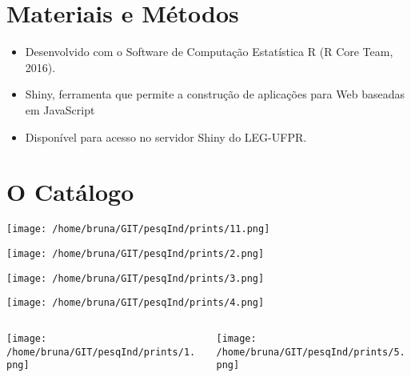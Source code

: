 \section{Materiais e Métodos}\label{materiais-e-metodos}

\begin{frame}

\begin{itemize}
\tightlist
\item
  Desenvolvido com o Software de Computação Estatística R (R Core Team,
  2016).
\item
  Shiny, ferramenta que permite a construção de aplicações para Web
  baseadas em JavaScript
\item
  Disponível para acesso no servidor Shiny do LEG-UFPR.
\end{itemize}

\end{frame}

\section{O Catálogo}\label{o-catalogo}

\begin{frame}

\texttt{[image: /home/bruna/GIT/pesqInd/prints/11.png]}

\end{frame}

\begin{frame}

\texttt{[image: /home/bruna/GIT/pesqInd/prints/2.png]}

\texttt{[image: /home/bruna/GIT/pesqInd/prints/3.png]}

\texttt{[image: /home/bruna/GIT/pesqInd/prints/4.png]}

\end{frame}

\begin{frame}

\vspace{-.3cm}\begin{columns}
 \begin{column}{.5\textwidth}

  \begin{center}
   \texttt{[image: /home/bruna/GIT/pesqInd/prints/1.png]}
  \end{center}

 \end{column}
 \begin{column}{.5\textwidth}

  \begin{center}
   \texttt{[image: /home/bruna/GIT/pesqInd/prints/5.png]}
  \end{center}

 \end{column}
\end{columns}

\end{frame}

